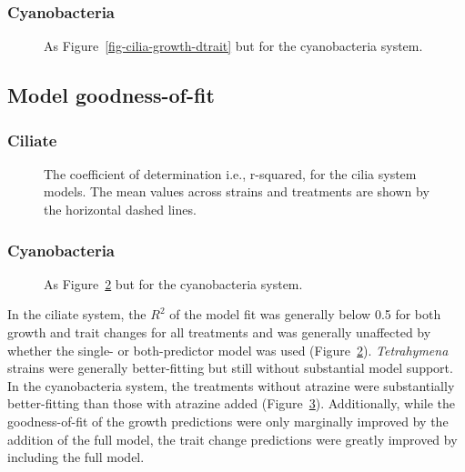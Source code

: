 \documentclass[
  letterpaper,
  DIV=11,
  numbers=noendperiod]{scrartcl}
\begin{document}
\subsubsection{Cyanobacteria}\label{cyanobacteria-4}

\begin{figure}


\caption{\label{fig-cyano-growth-dtrait}As
Figure~\ref{fig-cilia-growth-dtrait} but for the cyanobacteria system.}

\end{figure}%

\subsection{Model goodness-of-fit}\label{model-goodness-of-fit}

\subsubsection{Ciliate}\label{ciliate-5}

\begin{figure}


\caption{\label{fig-cilia-R2}The coefficient of determination i.e.,
r-squared, for the cilia system models. The mean values across strains
and treatments are shown by the horizontal dashed lines.}

\end{figure}%

\subsubsection{Cyanobacteria}\label{cyanobacteria-5}

\begin{figure}


\caption{\label{fig-cyano-R2}As Figure~\ref{fig-cilia-R2} but for the
cyanobacteria system.}

\end{figure}%

In the ciliate system, the \(R^2\) of the model fit was generally below
0.5 for both growth and trait changes for all treatments and was
generally unaffected by whether the single- or both-predictor model was
used (Figure~\ref{fig-cilia-R2}). \emph{Tetrahymena} strains were
generally better-fitting but still without substantial model support. In
the cyanobacteria system, the treatments without atrazine were
substantially better-fitting than those with atrazine added
(Figure~\ref{fig-cyano-R2}). Additionally, while the goodness-of-fit of
the growth predictions were only marginally improved by the addition of
the full model, the trait change predictions were greatly improved by
including the full model.
\end{document}
